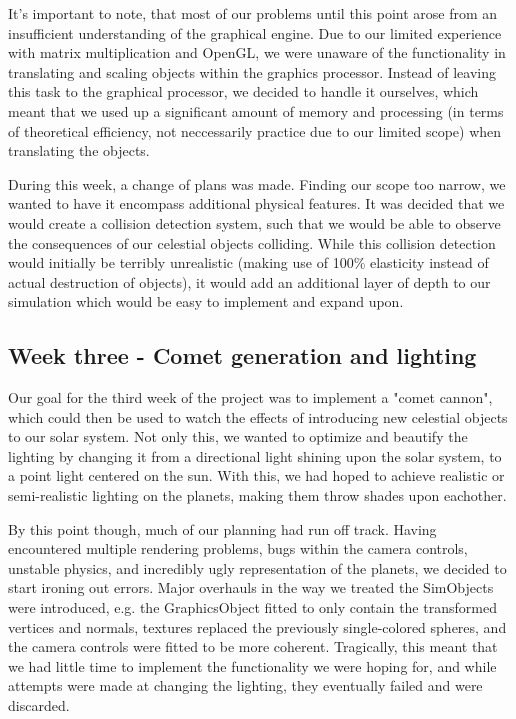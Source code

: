 It's important to note, that most of our problems until this point arose from an insufficient understanding of the graphical engine. Due to our limited experience with matrix multiplication and OpenGL, we were unaware of the functionality in translating and scaling objects within the graphics processor. Instead of leaving this task to the graphical processor, we decided to handle it ourselves, which meant that we used up a significant amount of memory and processing (in terms of theoretical efficiency, not neccessarily practice due to our limited scope) when translating the objects.

During this week, a change of plans was made. Finding our scope too narrow, we wanted to have it encompass additional physical features. It was decided that we would create a collision detection system, such that we would be able to observe the consequences of our celestial objects colliding. While this collision detection would initially be terribly unrealistic (making use of 100\% elasticity instead of actual destruction of objects), it would add an additional layer of depth to our simulation which would be easy to implement and expand upon.

\subsection{Week three - Comet generation and lighting}
Our goal for the third week of the project was to implement a "comet cannon", which could then be used to watch the effects of introducing new celestial objects to our solar system. Not only this, we wanted to optimize and beautify the lighting by changing it from a directional light shining upon the solar system, to a point light centered on the sun. With this, we had hoped to achieve realistic or semi-realistic lighting on the planets, making them throw shades upon eachother.

By this point though, much of our planning had run off track. Having encountered multiple rendering problems, bugs within the camera controls, unstable physics, and incredibly ugly representation of the planets, we decided to start ironing out errors. Major overhauls in the way we treated the SimObjects were introduced, e.g. the GraphicsObject fitted to only contain the transformed vertices and normals, textures replaced the previously single-colored spheres, and the camera controls were fitted to be more coherent. Tragically, this meant that we had little time to implement the functionality we were hoping for, and while attempts were made at changing the lighting, they eventually failed and were discarded. 

